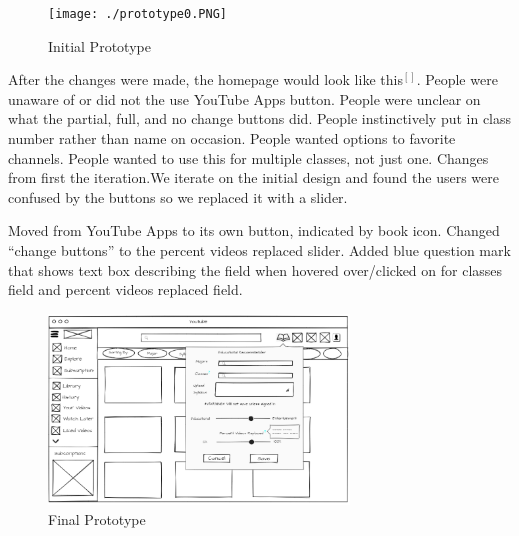 \documentclass[letterpaper]{article} %
\begin{document}
\begin{figure}[h]
    \centering
    \texttt{[image: ./prototype0.PNG]}
    \caption{Initial Prototype}
    \label{fig:prototype0}
\end{figure}

 After the changes were made, the homepage would look like this$^[]$. People were unaware of or did not the use YouTube Apps button. People were unclear on what the partial, full, and no change buttons did. People instinctively put in class number rather than name on occasion. People wanted options to favorite channels. People wanted to use this for multiple classes, not just one. Changes from first the iteration.We iterate on the initial design and found the users were confused by the buttons so we replaced it with a slider. 

Moved from YouTube Apps to its own button, indicated by book icon. Changed “change buttons” to the percent videos replaced slider. Added blue question mark that shows text box describing the field when hovered over/clicked on for classes field and percent videos replaced field.

\begin{figure}[h]
    \centering
    \includegraphics[width=8cm, hieght=8cm]{./prototype.PNG}
    \caption{Final Prototype}
    \label{fig:prototype}
\end{figure}
\end{document}
